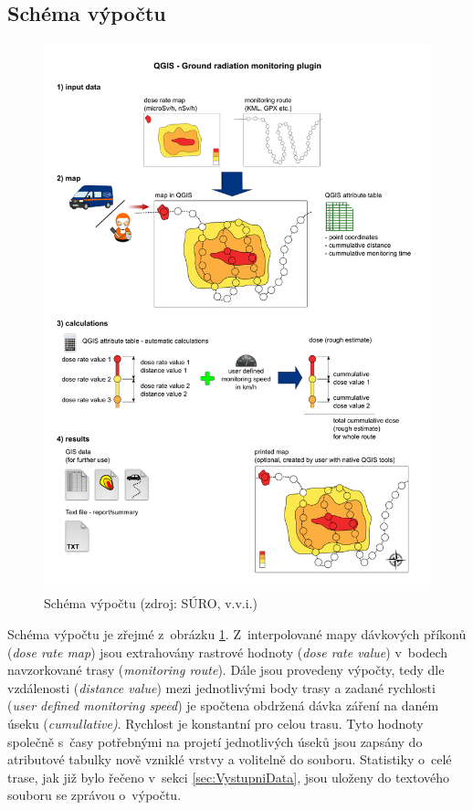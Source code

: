 \subsection{Schéma výpočtu}
\begin{figure}[H] \centering
    \includegraphics[scale=0.4]{./pictures/computation_scheme.png}
      	\caption[Schéma výpočtu]{Schéma výpočtu (zdroj: SÚRO, v.v.i.)}
    	\label{fig:SchemeOfComputation}
\end{figure}

Schéma výpočtu je zřejmé z~obrázku
\ref{fig:SchemeOfComputation}. Z~interpolované mapy dávkových příkonů
(\textit{dose rate map}) jsou extrahovány rastrové hodnoty
(\textit{dose rate value}) v~bodech navzorkované trasy
(\textit{monitoring route}). Dále jsou provedeny výpočty, tedy dle
vzdálenosti (\textit{distance value}) mezi jednotlivými body trasy a
zadané rychlosti (\textit{user defined monitoring speed}) je spočtena
obdržená dávka záření na daném úseku (\textit{cumullative)}. Rychlost
je konstantní pro celou trasu. Tyto hodnoty společně s~časy potřebnými
na projetí jednotlivých úseků jsou zapsány do atributové tabulky nově
vzniklé vrstvy a volitelně do  souboru. Statistiky o~celé
trase, jak již bylo řečeno v~sekci \ref{sec:VystupniData}, jsou
uloženy do textového souboru se zprávou o~výpočtu.

